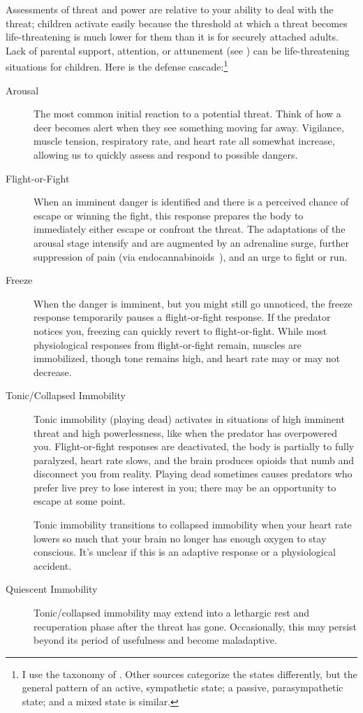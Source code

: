 \documentclass[11pt,oneside]{book}
\let\cite\parencite
\begin{document}
Assessments of threat and power are relative to your ability to deal with the threat; children activate easily because the threshold at which a threat becomes life-threatening is much lower for them than it is for securely attached adults. Lack of parental support, attention, or attunement (see \textcite{fivePillars}) can be life-threatening situations for children. Here is the defense cascade:\footnote{I use the taxonomy of \textcite{kozlowskaDefenseCascade}. Other sources categorize the states differently, but the general pattern of an active, sympathetic state; a passive, parasympathetic state; and a mixed state is similar.}
\begin{description}
    \item[Arousal] The most common initial reaction to a potential threat. Think of how a deer becomes alert when they see something moving far away. Vigilance, muscle tension, respiratory rate, and heart rate all somewhat increase, allowing us to quickly assess and respond to possible dangers.
    \item[Flight-or-Fight\footnotemark] 
    When an imminent danger is identified and there is a perceived chance of escape or winning the fight, this response prepares the body to immediately either escape or confront the threat. The adaptations of the arousal stage intensify and are augmented by an adrenaline surge, further suppression of pain (via endocannabinoids~\cite{lanius2018review}), and an urge to fight or run.
    \item[Freeze] When the danger is imminent, but you might still go unnoticed, the freeze response temporarily pauses a flight-or-fight response. If the predator notices you, freezing can quickly revert to flight-or-fight. While most physiological responses from flight-or-fight remain, muscles are immobilized, though tone remains high, and heart rate may or may not decrease.
    \item[Tonic/Collapsed Immobility] Tonic immobility (playing dead) activates in situations of high imminent threat and high powerlessness, like when the predator has overpowered you. Flight-or-fight responses are deactivated, the body is partially to fully paralyzed, heart rate slows, and the brain produces opioids that numb and disconnect you from reality. Playing dead sometimes causes predators who prefer live prey to lose interest in you; there may be an opportunity to escape at some point.
    
    Tonic immobility transitions to collapsed immobility when your heart rate lowers so much that your brain no longer has enough oxygen to stay conscious. It's unclear if this is an adaptive response or a physiological accident.
    \item[Quiescent Immobility] Tonic/collapsed immobility may extend into a lethargic rest and recuperation phase after the threat has gone. Occasionally, this may persist beyond its period of usefulness and become maladaptive.
\end{description}
\end{document}

